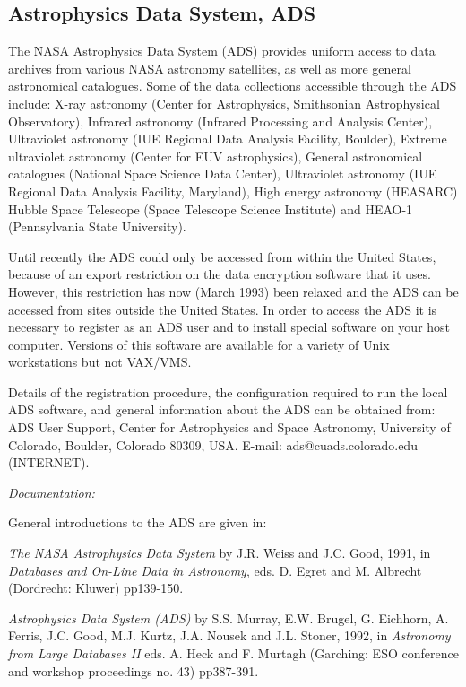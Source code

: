 \documentclass[twoside,11pt]{article}
\newcommand{\xlabel}[1]{}
\begin{document}
\subsection{Astrophysics Data System, ADS
\xlabel{astrophysics_data_system_ads}}

The NASA Astrophysics Data System (ADS) provides uniform access to data
archives from various NASA astronomy satellites, as well as more general
astronomical catalogues. Some of the data collections accessible through
the ADS include: X-ray astronomy (Center for Astrophysics, Smithsonian
Astrophysical Observatory), Infrared astronomy (Infrared Processing and
Analysis Center), Ultraviolet astronomy (IUE Regional Data Analysis
Facility, Boulder), Extreme ultraviolet astronomy (Center for EUV
astrophysics), General astronomical catalogues (National Space Science
Data Center), Ultraviolet astronomy (IUE Regional Data Analysis
Facility, Maryland), High energy astronomy (HEASARC) Hubble Space
Telescope (Space Telescope Science Institute) and HEAO-1 (Pennsylvania
State University).

Until recently the ADS could only be accessed from within the United
States, because of an export restriction on the data encryption software
that it uses. However, this restriction has now (March 1993) been
relaxed and the ADS can be accessed from sites outside the United
States. In order to access the ADS it is necessary to register as an ADS
user and to install special software on your host computer. Versions of
this software are available for a variety of Unix workstations but not
VAX/VMS.

Details of the registration procedure, the configuration required to
run the local ADS software, and general information about the ADS can be
obtained from: ADS User Support, Center for Astrophysics and Space
Astronomy, University of Colorado, Boulder, Colorado 80309, USA. E-mail:
ads@cuads.colorado.edu (INTERNET).

{\it Documentation:}

General introductions to the ADS are given in:

 {\it The NASA Astrophysics Data System} by J.R. Weiss and J.C. Good,
1991, in {\it Databases and On-Line Data in Astronomy}, eds. D. Egret
and M. Albrecht (Dordrecht: Kluwer) pp139-150.

{\it Astrophysics Data System (ADS)} by S.S. Murray, E.W. Brugel, G.
Eichhorn, A. Ferris, J.C. Good, M.J. Kurtz, J.A. Nousek and J.L. Stoner,
1992, in {\it Astronomy from Large Databases II} eds. A. Heck and F.
Murtagh (Garching: ESO conference and workshop proceedings no. 43)
pp387-391.
\end{document}
